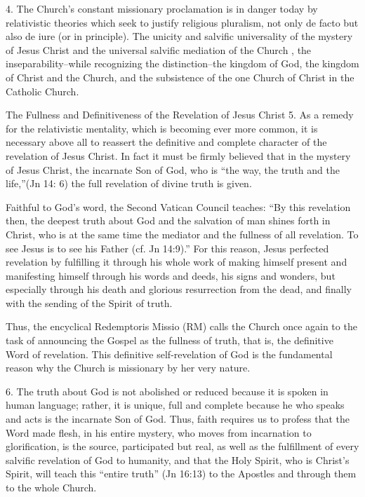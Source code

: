 \documentclass[oneside]{book}
\begin{document}
4. The Church's constant missionary proclamation is in danger today by
relativistic theories which seek to justify religious pluralism, not only de
facto but also de iure (or in principle). The unicity and salvific universality
of the mystery of Jesus Christ and the universal salvific mediation of the
Church , the inseparability--while recognizing the distinction--the kingdom of
God, the kingdom of Christ and the Church, and the subsistence of the one Church
of Christ in the Catholic Church.

The Fullness and Definitiveness of the Revelation of Jesus Christ
5. As a remedy for the relativistic mentality, which is becoming ever more
common, it is necessary above all to reassert the definitive and complete
character of the revelation of Jesus Christ. In fact it must be firmly believed
that in the mystery of Jesus Christ, the incarnate Son of God, who is ``the way,
the truth and the life,''(Jn 14: 6) the full revelation of divine truth is
given.

Faithful to God's word, the Second Vatican Council teaches: ``By this revelation
then, the deepest truth about God and the salvation of man shines forth in
Christ, who is at the same time the mediator and the fullness of all
revelation. To see Jesus is to see his Father (cf. Jn 14:9).'' For this reason,
Jesus perfected revelation by fulfilling it through his whole work of making
himself present and manifesting himself through his words and deeds, his signs
and wonders, but especially through his death and glorious resurrection from the
dead, and finally with the sending of the Spirit of truth.

Thus, the encyclical Redemptoris Missio (RM) calls the Church once again to the
task of announcing the Gospel as the fullness of truth, that is, the definitive
Word of revelation. This definitive self-revelation of God is the fundamental
reason why the Church is missionary by her very nature.



6. The truth about God is not abolished or reduced because it is spoken in human
language; rather, it is unique, full and complete because he who speaks and acts
is the incarnate Son of God. Thus, faith requires us to profess that the Word
made flesh, in his entire mystery, who moves from incarnation to glorification,
is the source, participated but real, as well as the fulfillment of every
salvific revelation of God to humanity, and that the Holy Spirit, who is
Christ's Spirit, will teach this ``entire truth'' (Jn 16:13) to the Apostles and
through them to the whole Church.
\end{document}
